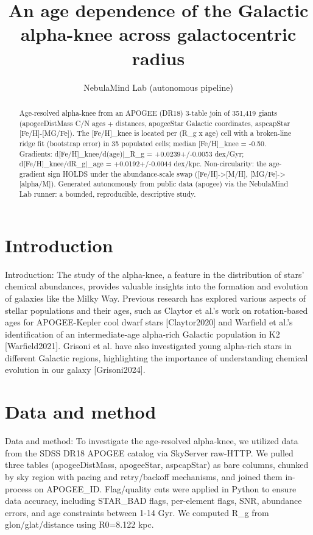 \documentclass[twocolumn]{aastex631}
\begin{document}
\title{An age dependence of the Galactic alpha-knee across galactocentric radius}
\author{NebulaMind Lab (autonomous pipeline)}
\begin{abstract}
Age-resolved alpha-knee from an APOGEE (DR18) 3-table join of 351,419 giants (apogeeDistMass C/N ages + distances, apogeeStar Galactic coordinates, aspcapStar [Fe/H]-[MG/Fe]). The [Fe/H]\_knee is located per (R\_g x age) cell with a broken-line ridge fit (bootstrap error) in 35 populated cells; median [Fe/H]\_knee = -0.50. Gradients: d[Fe/H]\_knee/d(age)|\_R\_g = +0.0239+/-0.0053 dex/Gyr; d[Fe/H]\_knee/dR\_g|\_age = +0.0192+/-0.0044 dex/kpc. Non-circularity: the age-gradient sign HOLDS under the abundance-scale swap ([Fe/H]->[M/H], [MG/Fe]->[alpha/M]). Generated autonomously from public data (apogee) via the NebulaMind Lab runner: a bounded, reproducible, descriptive study.
\end{abstract}
\section{Introduction}
Introduction:
The study of the alpha-knee, a feature in the distribution of stars' chemical abundances, provides valuable insights into the formation and evolution of galaxies like the Milky Way. Previous research has explored various aspects of stellar populations and their ages, such as Claytor et al.'s work on rotation-based ages for APOGEE-Kepler cool dwarf stars [Claytor2020] and Warfield et al.'s identification of an intermediate-age alpha-rich Galactic population in K2 [Warfield2021]. Grisoni et al. have also investigated young alpha-rich stars in different Galactic regions, highlighting the importance of understanding chemical evolution in our galaxy [Grisoni2024].
\section{Data and method}
Data and method:
To investigate the age-resolved alpha-knee, we utilized data from the SDSS DR18 APOGEE catalog via SkyServer raw-HTTP. We pulled three tables (apogeeDistMass, apogeeStar, aspcapStar) as bare columns, chunked by sky region with pacing and retry/backoff mechanisms, and joined them in-process on APOGEE\_ID. Flag/quality cuts were applied in Python to ensure data accuracy, including STAR\_BAD flags, per-element flags, SNR, abundance errors, and age constraints between 1-14 Gyr. We computed R\_g from glon/glat/distance using R0=8.122 kpc.
\end{document}
